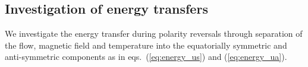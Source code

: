 

\subsection{Investigation of energy transfers}
\label{sec:energy_transfer}

{\color{red}
We investigate the energy transfer during polarity reversals through separation of the flow, magnetic field and temperature into the equatorially symmetric and anti-symmetric components as in eqs.~(\ref{eq:energy_us}) and (\ref{eq:energy_ua}).
}

